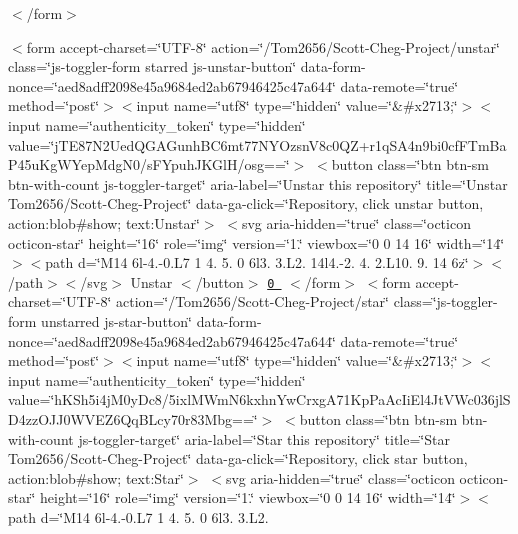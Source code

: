\begin{DoxyItemize}
 

    $<$/form$>$ 


\item 



 $<$form accept-\/charset=\char`\"{}\+U\+T\+F-\/8\char`\"{} action=\char`\"{}/\+Tom2656/\+Scott-\/\+Cheg-\/\+Project/unstar\char`\"{} class=\char`\"{}js-\/toggler-\/form starred js-\/unstar-\/button\char`\"{} data-\/form-\/nonce=\char`\"{}aed8adff2098e45a9684ed2ab67946425c47a644\char`\"{} data-\/remote=\char`\"{}true\char`\"{} method=\char`\"{}post\char`\"{}$>$$<$input name=\char`\"{}utf8\char`\"{} type=\char`\"{}hidden\char`\"{} value=\char`\"{}\&\#x2713;\char`\"{}$>$$<$input name=\char`\"{}authenticity\+\_\+token\char`\"{} type=\char`\"{}hidden\char`\"{} value=\char`\"{}j\+T\+E87\+N2\+Ued\+Q\+G\+A\+Gunh\+B\+C6mt77\+N\+Y\+Ozsn\+V8c0\+Q\+Z+r1q\+S\+A4n9bi0cf\+F\+Tm\+Ba\+P45u\+Kg\+W\+Yep\+Mdg\+N0/s\+F\+Ypuh\+J\+K\+Gl\+H/osg==\char`\"{}$>$ $<$button class=\char`\"{}btn btn-\/sm btn-\/with-\/count js-\/toggler-\/target\char`\"{} aria-\/label=\char`\"{}\+Unstar this repository\char`\"{} title=\char`\"{}\+Unstar Tom2656/\+Scott-\/\+Cheg-\/\+Project\char`\"{} data-\/ga-\/click=\char`\"{}\+Repository, click unstar button, action\+:blob\#show; text\+:\+Unstar\char`\"{}$>$ $<$svg aria-\/hidden=\char`\"{}true\char`\"{} class=\char`\"{}octicon octicon-\/star\char`\"{} height=\char`\"{}16\char`\"{} role=\char`\"{}img\char`\"{} version=\char`\"{}1.\char`\"{} viewbox=\char`\"{}0 0 14 16\char`\"{} width=\char`\"{}14\char`\"{}$>$$<$path d=\char`\"{}\+M14 6l-\/4.-\/0.\+L7 1 4. 5. 0 6l3. 3.\+L2. 14l4.-\/2. 4. 2.\+L10. 9. 14 6z\char`\"{}$>$$<$/path$>$$<$/svg$>$ Unstar $<$/button$>$ \href{/Tom2656/Scott-Cheg-Project/stargazers}{\tt 0 } $<$/form$>$ $<$form accept-\/charset=\char`\"{}\+U\+T\+F-\/8\char`\"{} action=\char`\"{}/\+Tom2656/\+Scott-\/\+Cheg-\/\+Project/star\char`\"{} class=\char`\"{}js-\/toggler-\/form unstarred js-\/star-\/button\char`\"{} data-\/form-\/nonce=\char`\"{}aed8adff2098e45a9684ed2ab67946425c47a644\char`\"{} data-\/remote=\char`\"{}true\char`\"{} method=\char`\"{}post\char`\"{}$>$$<$input name=\char`\"{}utf8\char`\"{} type=\char`\"{}hidden\char`\"{} value=\char`\"{}\&\#x2713;\char`\"{}$>$$<$input name=\char`\"{}authenticity\+\_\+token\char`\"{} type=\char`\"{}hidden\char`\"{} value=\char`\"{}h\+K\+Sh5i4j\+M0y\+Dc8/5ixl\+M\+Wm\+N6kxhn\+Yw\+Crxg\+A71\+Kp\+Pa\+Ac\+Ii\+El4\+Jt\+V\+Wc036jl\+S\+D4zz\+O\+J\+J0\+W\+V\+E\+Z6\+Qq\+B\+Lcy70r83\+Mbg==\char`\"{}$>$ $<$button class=\char`\"{}btn btn-\/sm btn-\/with-\/count js-\/toggler-\/target\char`\"{} aria-\/label=\char`\"{}\+Star this repository\char`\"{} title=\char`\"{}\+Star Tom2656/\+Scott-\/\+Cheg-\/\+Project\char`\"{} data-\/ga-\/click=\char`\"{}\+Repository, click star button, action\+:blob\#show; text\+:\+Star\char`\"{}$>$ $<$svg aria-\/hidden=\char`\"{}true\char`\"{} class=\char`\"{}octicon octicon-\/star\char`\"{} height=\char`\"{}16\char`\"{} role=\char`\"{}img\char`\"{} version=\char`\"{}1.\char`\"{} viewbox=\char`\"{}0 0 14 16\char`\"{} width=\char`\"{}14\char`\"{}$>$$<$path d=\char`\"{}\+M14 6l-\/4.-\/0.\+L7 1 4. 5. 0 6l3. 3.\+L2. 
\end{DoxyItemize}
